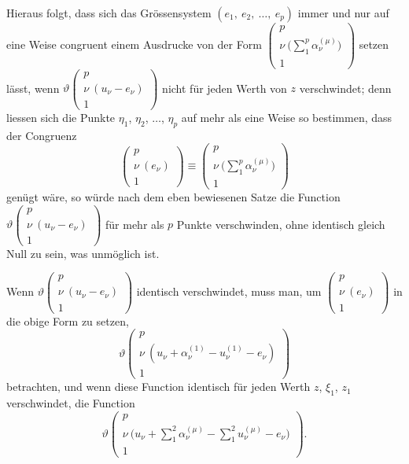 \documentclass[12pt,a4paper]{article}
\begin{document}
Hieraus folgt, dass sich das Grössensystem $(e_1,\ e_2,\ \ldots,\ e_p)$ immer und nur auf eine Weise congruent einem Ausdrucke von der Form $\left(\begin{array}{c} p\\ \nu\ \bigl(\sum\limits_1^p \alpha_\nu^{(\mu)}\bigr)\\ 1 \end{array}\right)$ setzen lässt, wenn $\vartheta\left(\begin{array}{c} p\\ \nu\ (u_\nu - e_\nu)\\ 1 \end{array}\right)$ nicht für jeden Werth von $z$ verschwindet; denn liessen sich die Punkte $\eta_1$, $\eta_2$, $\ldots$, $\eta_p$ auf mehr als eine Weise so bestimmen, dass der Congruenz
\[ \left(\begin{array}{c} p\\ \nu\ (e_\nu)\\ 1 \end{array}\right) \equiv \left(\begin{array}{c} p\\ \nu\ \bigl(\sum\limits_1^p \alpha_\nu^{(\mu)}\bigr)\\ 1 \end{array}\right) \]
genügt wäre, so würde nach dem eben bewiesenen Satze die Function $\vartheta\left(\begin{array}{c} p\\ \nu\ (u_\nu - e_\nu)\\ 1 \end{array}\right)$ für mehr als $p$ Punkte verschwinden, ohne identisch gleich Null zu sein, was unmöglich ist.

Wenn $\vartheta\left(\begin{array}{c} p\\ \nu\ (u_\nu - e_\nu)\\ 1 \end{array}\right)$ identisch verschwindet, muss man, um $\left(\begin{array}{c} p\\ \nu\ (e_\nu)\\ 1 \end{array}\right)$ in die obige Form zu setzen,
\[ \vartheta\left(\begin{array}{c} p\\ \nu\ (u_\nu + \alpha_\nu^{(1)} - u_\nu^{(1)} - e_\nu)\\ 1 \end{array}\right) \]
betrachten, und wenn diese Function identisch für jeden Werth $z$, $\xi_1$, $z_1$ verschwindet, die Function
\[ \vartheta\left(\begin{array}{c} p\\ \nu\ \bigl(u_\nu + \sum\limits_1^2 \alpha_\nu^{(\mu)} - \sum\limits_1^2 u_\nu^{(\mu)} - e_\nu\bigr)\\ 1 \end{array}\right). \]
\end{document}
